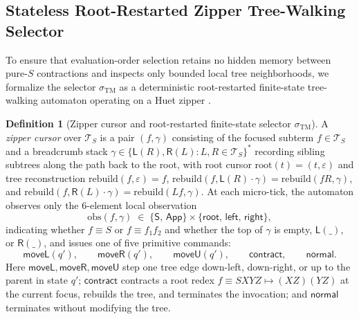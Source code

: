 \documentclass[11pt,reqno]{amsart}
\numberwithin{equation}{section}
\theoremstyle{plain}
\theoremstyle{definition}
\newtheorem{definition}[theorem]{Definition}
\theoremstyle{remark}
\newcommand{\TS}{\mathcal{T}_S}
\begin{document}
\subsection{Stateless Root-Restarted Zipper Tree-Walking Selector}\label{subsec:zipper-selector}

To ensure that evaluation-order selection retains no hidden memory between pure-$S$ contractions and inspects only bounded local tree neighborhoods, we formalize the selector $\sigma_{\mathrm{TM}}$ as a deterministic root-restarted finite-state tree-walking automaton operating on a Huet zipper \cite{Huet1997}.

\begin{definition}[Zipper cursor and root-restarted finite-state selector $\sigma_{\mathrm{TM}}$]\label{def:zipper-selector}
A \emph{zipper cursor} over $\TS$ is a pair $(f, \gamma)$ consisting of the focused subterm $f \in \TS$ and a breadcrumb stack $\gamma \in \{\mathsf{L}(R), \mathsf{R}(L) : L, R \in \TS\}^*$ recording sibling subtrees along the path back to the root, with root cursor $\mathrm{root}(t) = (t, \varepsilon)$ and tree reconstruction $\mathrm{rebuild}(f, \varepsilon) = f$, $\mathrm{rebuild}(f, \mathsf{L}(R)\cdot\gamma) = \mathrm{rebuild}(f R, \gamma)$, and $\mathrm{rebuild}(f, \mathsf{R}(L)\cdot\gamma) = \mathrm{rebuild}(L f, \gamma)$. At each micro-tick, the automaton observes only the $6$-element local observation
\[
  \mathrm{obs}(f, \gamma) \;\in\; \{\mathsf{S},\, \mathsf{App}\} \times \{\mathsf{root},\, \mathsf{left},\, \mathsf{right}\},
\]
indicating whether $f \equiv S$ or $f \equiv f_1 f_2$ and whether the top of $\gamma$ is empty, $\mathsf{L}(\_)$, or $\mathsf{R}(\_)$, and issues one of five primitive commands:
\[
  \mathsf{moveL}(q'), \qquad \mathsf{moveR}(q'), \qquad \mathsf{moveU}(q'), \qquad \mathsf{contract}, \qquad \mathsf{normal}.
\]
Here $\mathsf{moveL}, \mathsf{moveR}, \mathsf{moveU}$ step one tree edge down-left, down-right, or up to the parent in state $q'$; $\mathsf{contract}$ contracts a root redex $f \equiv S X Y Z \mapsto (X Z)(Y Z)$ at the current focus, rebuilds the tree, and terminates the invocation; and $\mathsf{normal}$ terminates without modifying the tree.


\end{definition}
\end{document}
